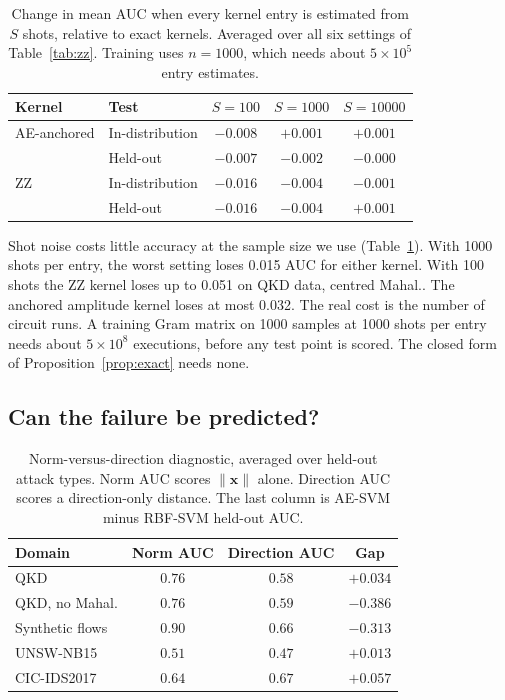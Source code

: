 \documentclass[pdflatex,sn-mathphys-num,lineno]{sn-jnl}
\theoremstyle{thmstyleone}
\begin{document}
\begin{table}[t]
  \centering
  \caption{Change in mean AUC when every kernel entry is estimated from $S$ shots,
  relative to exact kernels. Averaged over all six settings of Table~\ref{tab:zz}. Training uses
  $n=1000$, which needs about $5\times10^5$ entry estimates.}
  \label{tab:shots}
  \small
  \begin{tabular}{llccc}
    \toprule
    Kernel & Test & $S=100$ & $S=1000$ & $S=10000$ \\
    \midrule
    AE-anchored & In-distribution & $-0.008$ & $+0.001$ & $+0.001$ \\
     & Held-out & $-0.007$ & $-0.002$ & $-0.000$ \\
    ZZ & In-distribution & $-0.016$ & $-0.004$ & $-0.001$ \\
     & Held-out & $-0.016$ & $-0.004$ & $+0.001$ \\
    \bottomrule
  \end{tabular}
\end{table}

Shot noise costs little accuracy at the sample size we use (Table~\ref{tab:shots}). With 1000 shots per entry, the worst setting loses 0.015 AUC for either kernel. With 100 shots the ZZ kernel loses up to 0.051 on QKD data, centred Mahal.. The anchored amplitude kernel loses at most 0.032. The real cost is the number of circuit runs. A training Gram matrix on 1000 samples at 1000 shots per entry needs about $5\times10^8$ executions, before any test point is scored. The closed form of Proposition~\ref{prop:exact} needs none.

\subsection{Can the failure be predicted?}

\begin{table}[t]
  \centering
  \caption{Norm-versus-direction diagnostic, averaged over held-out attack types. Norm
  AUC scores $\|\mathbf{x}\|$ alone. Direction AUC scores a direction-only distance.
  The last column is AE-SVM minus RBF-SVM held-out AUC.}
  \label{tab:diag}
  \small
  \begin{tabular}{lccc}
    \toprule
    Domain & Norm AUC & Direction AUC & Gap \\
    \midrule
    QKD & $0.76$ & $0.58$ & $+0.034$ \\
    QKD, no Mahal. & $0.76$ & $0.59$ & $-0.386$ \\
    Synthetic flows & $0.90$ & $0.66$ & $-0.313$ \\
    UNSW-NB15 & $0.51$ & $0.47$ & $+0.013$ \\
    CIC-IDS2017 & $0.64$ & $0.67$ & $+0.057$ \\
    \bottomrule
  \end{tabular}
\end{table}
\end{document}
